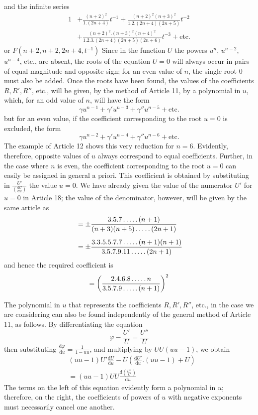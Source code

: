 and the infinite series
\[
\begin{aligned}
1&+\frac{(n+2)^2}{1.(2n+4)}t^{-1}
+\frac{(n+2)^2(n+3)^2}{1.2.(2n+4)(2n+5)}t^{-2}\\
&+\frac{(n+2)^2.(n+3)^2(n+4)^2}
{1.2.3.(2n+4)(2n+5)(2n+6)}t^{-3}+\mathrm{etc.}
\end{aligned}
\]
or $F(n+2,n+2,2n+4,t^{-1})$
Since in the function $U$ the powers $u^n$, $u^{n-2}$, $u^{n-4}$, etc., are absent, the roots of the equation $U=0$ will always occur in pairs of equal magnitude and opposite sign; for an even value of $n$, the single root $0$ must also be added. Once the roots have been found, the values of the coefficients $R,R',R''$, etc., will be given, by the method of Article 11, by a polynomial in $u$, which, for an odd value of $n$, will have the form
\[
\gamma u^{n-1}+\gamma'u^{n-3}+\gamma''u^{n-5}+\mathrm{etc.}
\]
but for an even value, if the coefficient corresponding to the root $u=0$ is excluded, the form
\[
\gamma u^{n-2}+\gamma'u^{n-4}+\gamma''u^{n-6}+\mathrm{etc.}
\]
The example of Article 12 shows this very reduction for $n=6$. Evidently, therefore, opposite values of $u$ always correspond to equal coefficients. Further, in the case where $n$ is even, the coefficient corresponding to the root $u=0$ can easily be assigned in general a priori. This coefficient is obtained by substituting in $\frac{U'}{(\frac{\mathrm{d}U}{\mathrm{d}u})}$ the value $u=0$. We have already given the value of the numerator $U'$ for $u=0$ in Article 18; the value of the denominator, however, will be given by the same article as
\[
\begin{aligned}&=\pm\frac{3.5.7\mathinner{.\,.\,.\,.\,.}(n+1)}
{(n+3)(n+5)\mathinner{.\,.\,.\,.\,.}(2n+1)}\\[5pt]&=\pm\frac{3.3.5.5.7.7\mathinner{.\,.\,.\,.\,.}(n+1)(n+1)}
{3.5.7.9.11\mathinner{.\,.\,.\,.\,.}(2n+1)}\end{aligned}
\]
and hence the required coefficient is
\[
=\left(\frac{2.4.6.8\mathinner{.\,.\,.\,.\,.} n}
{3.5.7.9\mathinner{.\,.\,.\,.\,.}(n+1)}\right)^2
\]

The polynomial in $u$ that represents the coefficients $R,R',R''$, etc., in the case we are considering can also be found independently of the general method of Article 11, as follows. By differentiating the equation
\[
\varphi-\frac{U'}U=\frac{U''}U
\]
then substituting $\frac{\mathrm{d}\varphi}{\mathrm{d}u}
=\frac1{1-uu}$, and multiplying by $UU(uu-1)$, we obtain
\[
\begin{aligned}&(uu-1)U'\frac{\mathrm{d}U}{\mathrm{d}u}
-U\left(\frac{\mathrm{d}U'}{\mathrm{d}u}.(uu-1)+U\right)\\[5pt]&=(uu-1)UU\frac{\mathrm{d}(\frac{U''}U)}{\mathrm{d}u}\end{aligned}
\]
The terms on the left of this equation evidently form a polynomial in $u$; therefore, on the right, the coefficients of powers of $u$ with negative exponents must necessarily cancel one another.

